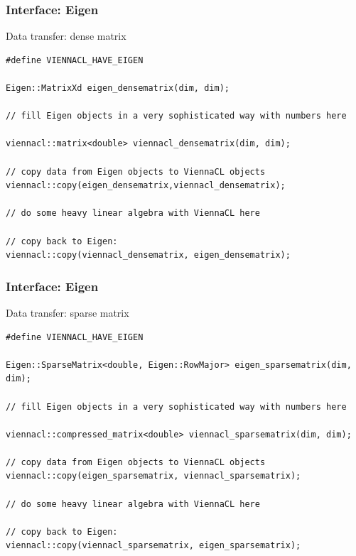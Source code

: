 \begin{frame}[fragile]
\frametitle{Interface: Eigen}
\begin{block}{Data transfer: dense matrix}
  \begin{lstlisting}
#define VIENNACL_HAVE_EIGEN
 
Eigen::MatrixXd eigen_densematrix(dim, dim);
 
// fill Eigen objects in a very sophisticated way with numbers here
 
viennacl::matrix<double> viennacl_densematrix(dim, dim);
 
// copy data from Eigen objects to ViennaCL objects
viennacl::copy(eigen_densematrix,viennacl_densematrix);
 
// do some heavy linear algebra with ViennaCL here 
 
// copy back to Eigen:
viennacl::copy(viennacl_densematrix, eigen_densematrix);
  \end{lstlisting} 
\end{block}

\end{frame}



\begin{frame}[fragile]
\frametitle{Interface: Eigen}
\begin{block}{Data transfer: sparse matrix}
  \begin{lstlisting}
#define VIENNACL_HAVE_EIGEN
 
Eigen::SparseMatrix<double, Eigen::RowMajor> eigen_sparsematrix(dim, dim);
 
// fill Eigen objects in a very sophisticated way with numbers here
 
viennacl::compressed_matrix<double> viennacl_sparsematrix(dim, dim);
 
// copy data from Eigen objects to ViennaCL objects
viennacl::copy(eigen_sparsematrix, viennacl_sparsematrix);
 
// do some heavy linear algebra with ViennaCL here 
 
// copy back to Eigen:
viennacl::copy(viennacl_sparsematrix, eigen_sparsematrix);
  \end{lstlisting} 
\end{block}

\end{frame}



